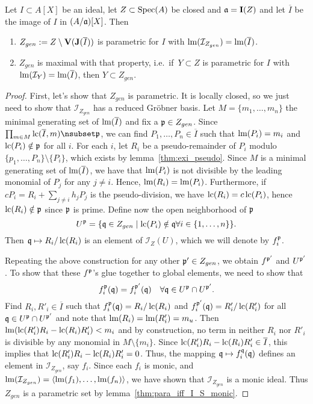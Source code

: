 \begin{theorem}\label{thm:Z_gen_para}
  Let $I \subset A[X]$ be an ideal, let $Z \subset \operatorname{Spec}(A)$ be closed and $\mathfrak{a} = \operatorname{\mathbf I}(Z)$ and let $\overline I$ be the image of $I$ in $(A/\mathfrak{a})[X]$. Then
  \begin{enumerate}
    \item $Z_{gen} := Z \setminus \operatorname{\mathbf V}(\operatorname{\mathbf J}(\overline I))$ is parametric for $I$ with $\operatorname{lm}(\mathcal I_{Z_{gen}}) = \operatorname{lm}(\overline I)$.
    \item $Z_{gen}$ is maximal with that property, i.e.\ if $\,Y \subset Z$ is parametric for $I$ with $\operatorname{lm}(\mathcal I_{Y}) = \operatorname{lm}(\overline I)$, then $Y \subset Z_{gen}$.
  \end{enumerate}
\end{theorem}
\begin{proof}
  First, let's show that $Z_{gen}$ is parametric. It is locally closed, so we just need to show that $\mathcal I_{Z_{gen}}$ has a reduced Gröbner basis. Let $M = \{m_{1}, \dots, m_{n}\}$ the minimal generating set of $\operatorname{lm}(\overline I)$ and fix a $\mathfrak p \in Z_{gen}$. Since $\prod_{m \in M} \LC(\overline I, m) \nsubset \p$, we can find $P_{1}, \dots, P_{n} \in \overline I$ such that $\operatorname{lm}(P_{i}) = m_{i}$ and $\operatorname{lc}(P_{i}) \notin \mathfrak p$ for all $i$. For each $i$, let $R_{i}$ be a pseudo-remainder of $P_{i}$ modulo $\{p_{1}, \dots, P_{n}\} \setminus \{P_{i}\}$, which exists by lemma~\ref{thm:exi_pseudo}. Since $M$ is a minimal generating set of $\operatorname{lm}(\overline I)$, we have that $\operatorname{lm}(P_{i})$ is not divisible by the leading monomial of $P_{j}$ for any $j \neq i$. Hence, $\operatorname{lm}(R_{i}) = \operatorname{lm}(P_{i})$. Furthermore, if $c P_{i} = R_{i} + \sum_{j \neq i} h_{j} P_{j}$ is the pseudo-division, we have $\operatorname{lc}(R_{i}) = c \operatorname{lc}(P_{i})$, hence $\operatorname{lc}(R_{i}) \notin \mathfrak p$ since $\mathfrak p$ is prime. Define now the open neighborhood of $\mathfrak p$
  \[U^{\mathfrak p} = \{\mathfrak{q} \in Z_{gen} \mid \operatorname{lc}(P_{i}) \notin \mathfrak{q} \forall i \in \{1, \dots, n\}\}.\]
  Then $\mathfrak{q} \mapsto R_{i}/\operatorname{lc}(R_{i})$ is an element of $\mathcal I_{Z}(U)$, which we will denote by $f^{\mathfrak p}_{i}$.

  Repeating the above construction for any other $\mathfrak p' \in Z_{gen}$, we obtain $f^{\mathfrak p'}$ and $U^{\mathfrak p'}$. To show that these $f^{\mathfrak p}$'s glue together to global elements, we need to show that
  \[f^{\mathfrak p}_{i}(\mathfrak{q}) = f^{\mathfrak p'}_{i}(\mathfrak{q}) \quad \forall \mathfrak{q} \in U^{\mathfrak p} \cap U^{\mathfrak p'}.\]
  Find $R_{i}, R'_{i} \in \overline I$ such that $f^{\mathfrak p}_{i}(\mathfrak{q}) = R_{i}/\operatorname{lc}(R_{i})$ and $f^{\mathfrak p'}_{i}(\mathfrak{q}) = R'_{i}/\operatorname{lc}(R'_{i})$ for all $\mathfrak{q} \in U^{\mathfrak p} \cap U^{\mathfrak p'}$ and note that $\operatorname{lm}(R_{i}) = \operatorname{lm}(R'_{i}) = m_{u}$. Then $\operatorname{lm}(\operatorname{lc}(R'_{i}) R_{i} - \operatorname{lc}(R_{i}) R'_{i}) < m_{i}$ and by construction, no term in neither $R_{i}$ nor $R'_{i}$ is divisible by any monomial in $M \setminus \{m_{i}\}$. Since $\operatorname{lc}(R'_{i}) R_{i} - \operatorname{lc}(R_{i}) R'_{i} \in \overline I$, this implies that $\operatorname{lc}(R'_{i}) R_{i} - \operatorname{lc}(R_{i}) R'_{i} = 0$. Thus, the mapping $\mathfrak{q} \mapsto f^{\mathfrak{q}}_{i}(\mathfrak{q})$ defines an element in $\mathcal I_{Z_{gen}}$, say $f_{i}$. Since each $f_{i}$ is monic, and $\operatorname{lm}(\mathcal I_{Z_{gen}}) = \langle \operatorname{lm}(f_{1}), \dots, \operatorname{lm}(f_{n}) \rangle$, we have shown that $\mathcal I_{Z_{gen}}$ is a monic ideal. Thus $Z_{gen}$ is a parametric set by lemma~\ref{thm:para_iff_I_S_monic}.


\end{proof}
